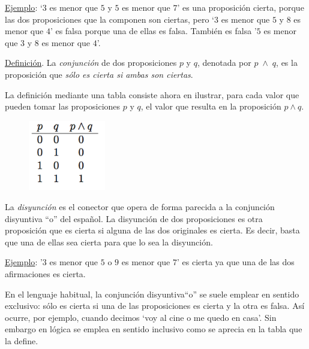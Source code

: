 \underline{Ejemplo}: `$3$ es menor que $5$ y $5$ es menor que $7$' es una proposición cierta, porque las dos proposiciones que la componen son ciertas, pero `$3$ es menor que $5$ y $8$ es menor que $4$' es falsa porque una de ellas es falsa. También es falsa '$5$ es menor que $3$ y $8$ es menor que $4$'.

\begin{multicols}{2}
\underline{Definición}. La \emph{conjunción} de dos proposiciones $p$ y  $q$, denotada por $p\;\wedge\; q$, es la proposición que \emph{sólo es cierta si ambas son ciertas}.

La definición mediante una tabla consiste ahora en ilustrar, para cada valor que pueden tomar las proposiciones $p$ y $q$, el valor que resulta en la proposición $p\wedge q$.
\begin{figure}[H] 
		\centering
		\includegraphics[width=0.3\textwidth]{imagenes/apendices/APENDICESIM14.png}
	\end{figure}
\end{multicols}

La \emph{disyunción} es el conector que opera de forma parecida a la conjunción disyuntiva ``o''  del español. La disyunción de dos proposiciones es otra proposición que es cierta si alguna de las dos originales es cierta. Es decir, basta que una de ellas sea cierta para que lo sea la disyunción. 

\underline{Ejemplo}: '$3$ es menor que $5$ o $9$ es menor que $7$' es cierta ya que una de las dos afirmaciones es cierta.

En el lenguaje habitual, la conjunción disyuntiva``o'' se suele emplear en sentido exclusivo: sólo es cierta si una de las proposiciones es cierta y la otra es falsa. Así ocurre, por ejemplo, cuando decimos `voy al cine o me quedo en casa'. Sin embargo en lógica se emplea en sentido inclusivo como se aprecia en la tabla que la define. 

